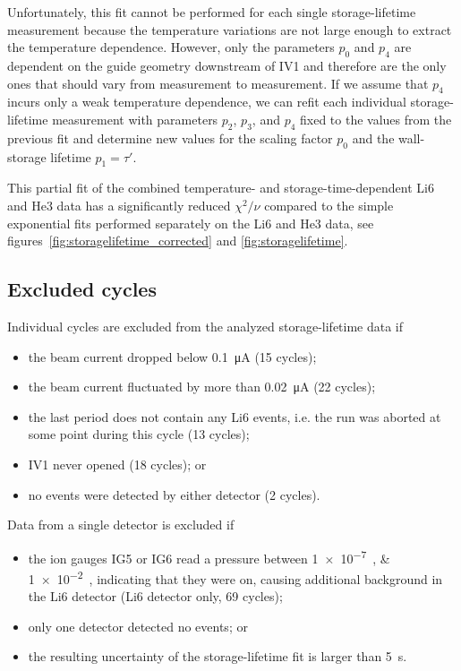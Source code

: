 \documentclass[10pt,letterpaper]{article}
\begin{document}
Unfortunately, this fit cannot be performed for each single storage-lifetime measurement because the temperature variations are not large enough to extract the temperature dependence. However, only the parameters $p_0$ and $p_4$ are dependent on the guide geometry downstream of IV1 and therefore are the only ones that should vary from measurement to measurement. If we assume that $p_4$ incurs only a weak temperature dependence, we can refit each individual storage-lifetime measurement with parameters $p_2$, $p_3$, and $p_4$ fixed to the values from the previous fit and determine new values for the scaling factor $p_0$ and the wall-storage lifetime $p_1 = \tau'$.

This partial fit of the combined temperature- and storage-time-dependent Li6 and He3 data has a significantly reduced $\chi^2/\nu$ compared to the simple exponential fits performed separately on the Li6 and He3 data, see figures~\ref{fig:storagelifetime_corrected} and \ref{fig:storagelifetime}.


\subsection{Excluded cycles}

Individual cycles are excluded from the analyzed storage-lifetime data if
\begin{itemize}
\item the beam current dropped below \SI{0.1}{\micro\ampere} (15 cycles);
\item the beam current fluctuated by more than \SI{0.02}{\micro\ampere} (22 cycles);
\item the last period does not contain any Li6 events, i.e. the run was aborted at some point during this cycle (13 cycles);
\item IV1 never opened (18 cycles); or
\item no events were detected by either detector (2 cycles).
\end{itemize}
Data from a single detector is excluded if
\begin{itemize}
\item the ion gauges IG5 or IG6 read a pressure between \SIlist{1e-7;1e-2}{\torr}, indicating that they were on, causing additional background in the Li6 detector (Li6 detector only, 69 cycles); 
\item only one detector detected no events; or
\item the resulting uncertainty of the storage-lifetime fit is larger than \SI{5}{\second}.
\end{itemize}
\end{document}
